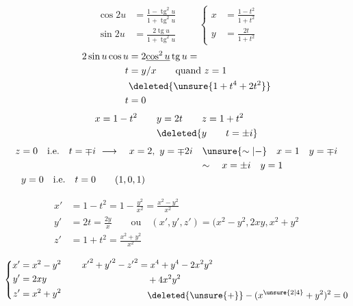 \[
\begin{aligned}
\cos 2u&=\frac{1-\operatorname{tg}^2u}{1+\operatorname{tg}^2u}\\
\sin 2u&=\frac{2\operatorname{tg}u}{1+\operatorname{tg}^2u}
\end{aligned}
\qquad
\left\{\begin{aligned}x&=\frac{1-t^2}{1+t^2}\\y&=\frac{2t}{1+t^2}\end{aligned}\right.
\]
\[
\begin{aligned}
2\sin u\cos u&=2\underline{\cos^2u}\operatorname{tg}u=\\
t&=y/x\qquad\text{quand }z=1\\
&\deleted{\unsure{1+t^4+2t^2}}\\
t&=0
\end{aligned}
\]
\[
\begin{aligned}
x=1-t^2\qquad &y=2t\qquad z=1+t^2\\
&\deleted{y\qquad t=\pm i}
\end{aligned}
\]
\[
\begin{aligned}
z=0\quad\text{i.e.}\quad t=\mp i&\ \longrightarrow\quad x=2,\ y=\mp2i\quad\unsure{\sim|-}\quad x=1\quad y=\mp i\\
&\hphantom{\ \longrightarrow\quad x=2,\ y=\mp2i}\quad\sim\quad x=\pm i\quad y=1\\
y=0\quad\text{i.e.}\quad t=0&\qquad(1,0,1)
\end{aligned}
\]


\[
\begin{aligned}
x'&=1-t^2=1-\frac{y^2}{x^2}=\frac{x^2-y^2}{x^2}\\
y'&=2t=\frac{2y}{x}\qquad\text{ou}\quad (x',y',z')=(x^2-y^2,2xy,x^2+y^2\\
z'&=1+t^2=\frac{x^2+y^2}{x^2}
\end{aligned}
\]

\[
\left\{\begin{aligned}
x'&=x^2-y^2\\y'&=2xy\\z'&=x^2+y^2
\end{aligned}\right.
\qquad
\begin{aligned}
{x'}^2+{y'}^2-{z'}^2&=x^4+y^4-2x^2y^2\\
&\quad+4x^2y^2\\
&\quad\deleted{\unsure{+}}-(x^{\unsure{2|4}}+y^2)^2=0
\end{aligned}
\]

